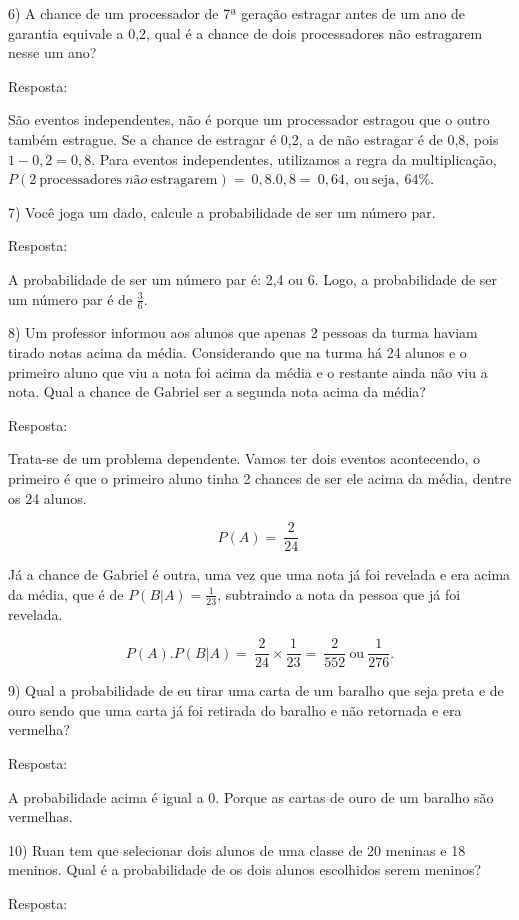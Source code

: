 {6) A chance de um processador de 7ª geração estragar antes de um ano de
garantia equivale a 0,2, qual é a chance de dois processadores não
estragarem nesse um ano?

Resposta:

São eventos independentes, não é porque um processador estragou que o
outro também estrague. Se a chance de estragar é 0,2, a de não estragar
é de 0,8, pois \(1 - 0,2 = 0,8\). Para eventos independentes, utilizamos
a regra da multiplicação,
\(P(2\ \text{processad}\text{ores}\ não\ \text{estragarem}) = \ 0,8.0,8 = \ 0,64,\ \text{ou}\ \text{seja},\ 64\%.\)

7) Você joga um dado, calcule a probabilidade de ser um número par.

Resposta:

A probabilidade de ser um número par é: 2,4 ou 6. Logo, a probabilidade
de ser um número par é de \(\frac{3}{6}\).

8) Um professor informou aos alunos que apenas 2 pessoas da turma haviam
tirado notas acima da média. Considerando que na turma há 24 alunos e o
primeiro aluno que viu a nota foi acima da média e o restante ainda não
viu a nota. Qual a chance de Gabriel ser a segunda nota acima da média?

Resposta:

Trata-se de um problema dependente. Vamos ter dois eventos acontecendo,
o primeiro é que o primeiro aluno tinha 2 chances de ser ele acima da
média, dentre os 24 alunos.

\[P(A) = \ \frac{2}{24}\ \]

Já a chance de Gabriel é outra, uma vez que uma nota já foi revelada e
era acima da média, que é de \(P(B|A) = \frac{1}{23}\), subtraindo a
nota da pessoa que já foi revelada.

\[P(A).P(B|A) = \ \frac{2}{24} \times \frac{1}{23} = \ \frac{2}{552}\ \text{ou}\ \frac{1}{276}.\]

9) Qual a probabilidade de eu tirar uma carta de um baralho que seja
preta e de ouro sendo que uma carta já foi retirada do baralho e não
retornada e era vermelha?

Resposta:

A probabilidade acima é igual a 0. Porque as cartas de ouro de um
baralho são vermelhas.

10) Ruan tem que selecionar dois alunos de uma classe de 20 meninas e 18
meninos. Qual é a probabilidade de os dois alunos escolhidos serem
meninos?

Resposta:

}
